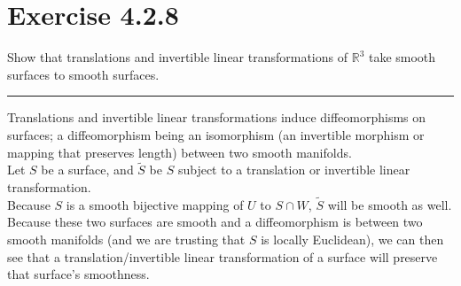 \documentclass[12pt]{article}
\begin{document}
\maketitle

\section*{Exercise 4.2.8}
\indent

Show that translations and invertible linear transformations of $\mathbb{R}^3$ take smooth surfaces to smooth surfaces.

\vspace{1cm}
\hrule
\vspace{1cm}
\noindent

Translations and invertible linear transformations induce diffeomorphisms on surfaces; a diffeomorphism being an isomorphism (an invertible morphism or mapping that preserves length) between two smooth manifolds. \\

Let $S$ be a surface, and $\widetilde{S}$ be $S$ subject to a translation or invertible linear transformation.\\
\indent
Because $S$ is a smooth bijective mapping of $U$ to $S \cap W$, $\widetilde{S}$ will be smooth as well.\\
\indent
Because these two surfaces are smooth and a diffeomorphism is between two smooth manifolds (and we are trusting that $S$ is locally Euclidean), we can then see that a translation/invertible linear transformation of a surface will preserve that surface's smoothness.
\end{document}

